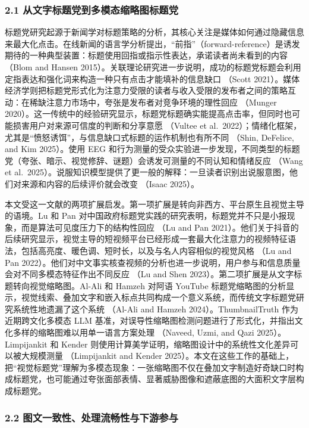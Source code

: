 \documentclass[
  fontset=none]{ctexart}
\begin{document}
\subsubsection{2.1 从文字标题党到多模态缩略图标题党}\label{ux4eceux6587ux5b57ux6807ux9898ux515aux5230ux591aux6a21ux6001ux7f29ux7565ux56feux6807ux9898ux515a}

标题党研究起源于新闻学对标题策略的分析，其核心关注是媒体如何通过隐藏信息来最大化点击。在线新闻的语言学分析提出，``前指''（forward-reference）是诱发期待的一种典型装置：标题使用回指或指示性表达，承诺读者尚未看到的内容 （Blom and Hansen 2015）。关联理论研究进一步说明，成功的标题党标题会利用定指表达和强化词来构造一种只有点击才能填补的信息缺口 （Scott 2021）。媒体经济学则把标题党形式化为注意力受限的读者与收入受限的发布者之间的策略互动：在稀缺注意力市场中，夸张是发布者对竞争环境的理性回应 （Munger 2020）。这一传统中的经验研究显示，标题党标题确实能提高点击率，但同时也可能损害用户对来源可信度的判断和分享意愿 （Vultee et al.~2022）；情绪化框架，尤其是``愤怒诱饵''，与信息缺口式标题的运作机制也有所不同 （Shin, DeFelice, and Kim 2025）。使用 EEG 和行为测量的受众实验进一步发现，不同类型的标题党（夸张、暗示、视觉修辞、谜题）会诱发可测量的不同认知和情绪反应 （Wang et al.~2025）。说服知识模型提供了更一般的解释：一旦读者识别出说服意图，他们对来源和内容的后续评价就会改变 （Isaac 2025）。

本文受这一文献的两项扩展启发。第一项扩展是转向非西方、平台原生且视觉主导的语境。Lu 和 Pan 对中国政府标题党实践的研究表明，标题党并不只是小报现象，而是算法可见度压力下的结构性回应 （Lu and Pan 2021）。他们关于抖音的后续研究显示，视觉主导的短视频平台已经形成一套最大化注意力的视频特征语法，包括高亮度、暖色调、短时长，以及与名人内容相似的视觉风格 （Lu and Pan 2022）。他们对中文事实核查视频的分析也进一步说明，用户参与和信息质量会对不同多模态特征作出不同反应 （Lu and Shen 2023）。第二项扩展是从文字标题转向视觉缩略图。Al-Ali 和 Hamzeh 对阿语 YouTube 标题党缩略图的分析显示，视觉线索、叠加文字和嵌入标点共同构成一个意义系统，而传统文字标题党研究系统性地遗漏了这个系统 （Al-Ali and Hamzeh 2024）。ThumbnailTruth 作为近期跨文化多模态 LLM 基准，对误导性缩略图检测问题进行了形式化，并指出文化多样的缩略图难以用单一语言方案处理 （Naveed, Uzmi, and Qazi 2025）。Limpijankit 和 Kender 则使用计算美学证明，缩略图设计中的系统性文化差异可以被大规模测量 （Limpijankit and Kender 2025）。本文在这些工作的基础上，把``视觉标题党''理解为多模态现象：一张缩略图不仅在叠加文字制造好奇缺口时构成标题党，也可能通过夸张面部表情、显著威胁图像和遮蔽底图的大面积文字层构成标题党。

\subsubsection{2.2 图文一致性、处理流畅性与下游参与}\label{ux56feux6587ux4e00ux81f4ux6027ux5904ux7406ux6d41ux7545ux6027ux4e0eux4e0bux6e38ux53c2ux4e0e}
\end{document}
